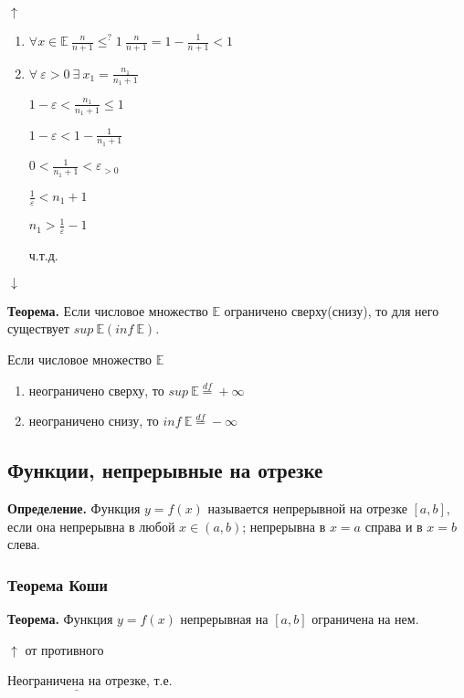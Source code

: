 \documentclass{article}
\begin{document}
    \(\uparrow\)
    \begin{enumerate}
        \item \(\forall x \in \mathbb{E}\ \frac{n}{n+1} \leq^{?} 1\ \frac{n}{n+1} = 1 - \frac{1}{n+1} < 1\)
        \item \( \forall\ \varepsilon > 0\ \exists\ x_1 = \frac{n_1}{n_1 + 1} \)
        
        \( 1 - \varepsilon < \frac{n_1}{n_1 + 1} \leq 1 \)

        \( 1 - \varepsilon < 1 - \frac{1}{n_1 + 1} \)
        
        \( 0 < \frac{1}{n_1 + 1} < \varepsilon_{> 0} \)

        \( \frac{1}{\varepsilon} < n_1 + 1 \)

        \( n_1 > \frac{1}{\varepsilon} - 1\)
        
        ч.т.д.
    \end{enumerate}
    \(\downarrow\)
    
    \textbf{Теорема.} Если числовое множество \(\mathbb{E}\) ограничено сверху(снизу), то для него существует \(sup\ \mathbb{E}(inf\ \mathbb{E})\).

    Если числовое множество \(\mathbb{E}\)  
    \begin{enumerate}
        \item неограничено сверху, то \(sup\ \mathbb{E} \stackrel{df}{=} +\infty\)
        \item неограничено снизу, то \(inf\ \mathbb{E} \stackrel{df}{=} -\infty\)
    \end{enumerate}

    \subsection{Функции, непрерывные на отрезке}
    \textbf{Определение.} Функция \( y = f(x) \) называется непрерывной на отрезке \( [a, b] \), если она непрерывна в любой \( x \in (a, b) \); непрерывна в \( x = a \) справа и в \( x = b \) слева.


    \subsubsection{Теорема Коши}
    \textbf{Теорема.} Функция \( y = f(x) \) непрерывная на \( [a, b] \) ограничена на нем.

    \(\uparrow\) от противного

    \(\underline{\textrm{Неограничена на отрезке}}\), т.е.
\end{document}

